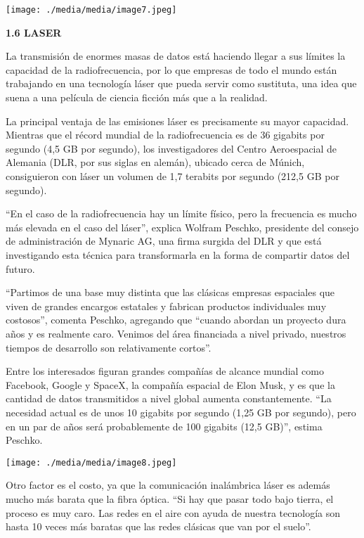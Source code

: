 \texttt{[image: ./media/media/image7.jpeg]}

\textbf{1.6 LASER}

La transmisión de enormes masas de datos está haciendo llegar a sus
límites la capacidad de la radiofrecuencia, por lo que empresas de todo
el mundo están trabajando en una tecnología láser que pueda servir como
sustituta, una idea que suena a una película de ciencia ficción más que
a la realidad.

La principal ventaja de las emisiones láser es precisamente su mayor
capacidad. Mientras que el récord mundial de la radiofrecuencia es de 36
gigabits por segundo (4,5 GB por segundo), los investigadores del Centro
Aeroespacial de Alemania (DLR, por sus siglas en alemán), ubicado cerca
de Múnich, consiguieron con láser un volumen de 1,7 terabits por segundo
(212,5 GB por segundo).

``En el caso de la radiofrecuencia hay un límite físico, pero la
frecuencia es mucho más elevada en el caso del láser'', explica Wolfram
Peschko, presidente del consejo de administración de Mynaric AG, una
firma surgida del DLR y que está investigando esta técnica para
transformarla en la forma de compartir datos del futuro.

``Partimos de una base muy distinta que las clásicas empresas espaciales
que viven de grandes encargos estatales y fabrican productos
individuales muy costosos'', comenta Peschko, agregando que ``cuando
abordan un proyecto dura años y es realmente caro. Venimos del área
financiada a nivel privado, nuestros tiempos de desarrollo son
relativamente cortos''.

Entre los interesados figuran grandes compañías de alcance mundial como
Facebook, Google y SpaceX, la compañía espacial de Elon Musk, y es que
la cantidad de datos transmitidos a nivel global aumenta constantemente.
``La necesidad actual es de unos 10 gigabits por segundo (1,25 GB por
segundo), pero en un par de años será probablemente de 100 gigabits
(12,5 GB)'', estima Peschko.

\texttt{[image: ./media/media/image8.jpeg]}

Otro factor es el costo, ya que la comunicación inalámbrica láser es
además mucho más barata que la fibra óptica. ``Si hay que pasar todo
bajo tierra, el proceso es muy caro. Las redes en el aire con ayuda de
nuestra tecnología son hasta 10 veces más baratas que las redes clásicas
que van por el suelo''.

